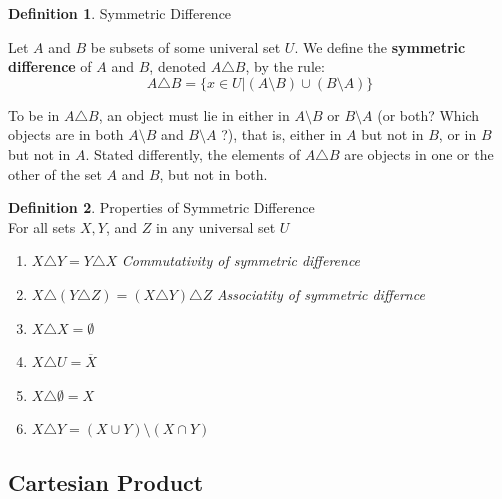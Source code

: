 \documentclass{book}
\theoremstyle{definition}
\newtheorem{definition}{Definition}[section]
\theoremstyle{remark}
\begin{document}
\begin{definition}
Symmetric Difference \\

    \begin{tcolorbox}
        Let $A$ and $B$ be subsets of some univeral set $U$. We define the  \textbf{symmetric difference} of $A$ and $B$, denoted $A \triangle B$, by the rule:
         \begin{equation*}
                A \triangle B = \{x \in U | (A \setminus B) \cup (B \setminus A) \}
            \end{equation*}
    \end{tcolorbox}    
        
    To be in $A \triangle B$, an object must lie in either in $A \setminus B$ or $B \setminus A$ (or both? Which objects are in both $A \setminus B$ and $B \setminus A$ ?), that is, either in $A$ but not in $B$, or in $B$ but not in $A$. Stated differently, the elements of $A \triangle B$ are objects in one or the other of the set $A$ and $B$, but not in both. 
\end{definition}


\begin{definition}
Properties of Symmetric Difference \\

For all sets $X, Y$, and $Z$ in any universal set $U$ \\

    \begin{enumerate}
        \item $X \triangle Y = Y \triangle X$ \textit{Commutativity of symmetric difference}
        \item $X \triangle (Y \triangle Z) = (X \triangle Y) \triangle Z$ \textit{Associatity of symmetric differnce}
        \item $X \triangle X = \emptyset$
        \item $X \triangle U = \overline{X}$
        \item $X \triangle \emptyset = X$
        \item $X \triangle Y = (X \cup Y) \setminus (X \cap Y)$
    \end{enumerate}
\end{definition}


\newpage
\subsection{Cartesian Product}
\end{document}
